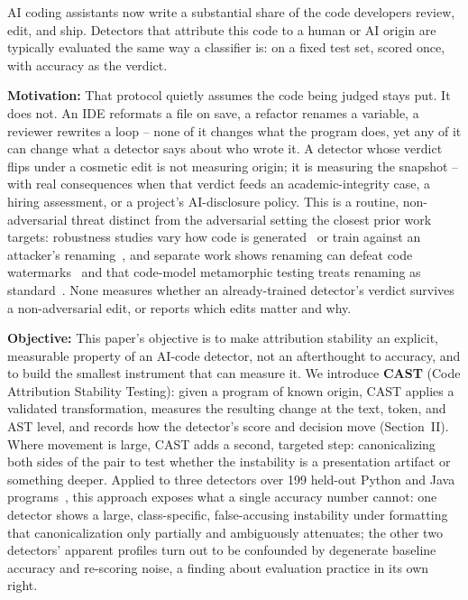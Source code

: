 \documentclass[10pt,conference]{IEEEtran}
\begin{document}
AI coding assistants now write a substantial share of the code developers review, edit, and ship. Detectors that attribute this code to a human or AI origin are typically evaluated the same way a classifier is: on a fixed test set, scored once, with accuracy as the verdict.

\textbf{Motivation:} That protocol quietly assumes the code being judged stays put. It does not. An IDE reformats a file on save, a refactor renames a variable, a reviewer rewrites a loop -- none of it changes what the program does, yet any of it can change what a detector says about who wrote it. A detector whose verdict flips under a cosmetic edit is not measuring origin; it is measuring the snapshot -- with real consequences when that verdict feeds an academic-integrity case, a hiring assessment, or a project's AI-disclosure policy. This is a routine, non-adversarial threat distinct from the adversarial setting the closest prior work targets: robustness studies vary how code is generated~\cite{hidinginplainsight} or train against an attacker's renaming~\cite{codegptsensorplus,droid}, and separate work shows renaming can defeat code watermarks~\cite{codewatermark} and that code-model metamorphic testing treats renaming as standard~\cite{metamorphicslr}. None measures whether an already-trained detector's verdict survives a non-adversarial edit, or reports which edits matter and why.

\textbf{Objective:} This paper's objective is to make attribution stability an explicit, measurable property of an AI-code detector, not an afterthought to accuracy, and to build the smallest instrument that can measure it. We introduce \textbf{CAST} (Code Attribution Stability Testing): given a program of known origin, CAST applies a validated transformation, measures the resulting change at the text, token, and AST level, and records how the detector's score and decision move (Section~II). Where movement is large, CAST adds a second, targeted step: canonicalizing both sides of the pair to test whether the instability is a presentation artifact or something deeper. Applied to three detectors over 199 held-out Python and Java programs~\cite{droid}, this approach exposes what a single accuracy number cannot: one detector shows a large, class-specific, false-accusing instability under formatting that canonicalization only partially and ambiguously attenuates; the other two detectors' apparent profiles turn out to be confounded by degenerate baseline accuracy and re-scoring noise, a finding about evaluation practice in its own right.
\end{document}
